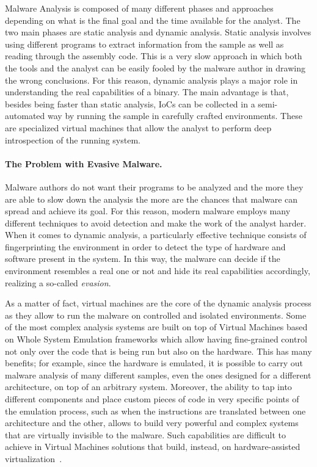 Malware Analysis is composed of many different phases and approaches depending on what is the final goal and the time available for the analyst. The two main phases are static analysis and dynamic analysis. Static analysis involves using different programs to extract information from the sample as well as reading through the assembly code. This is a very slow approach in which both the tools and the analyst can be easily fooled by the malware author in drawing the wrong conclusions. For this reason, dynamic analysis plays a major role in understanding the real capabilities of a binary. The main advantage is that, besides being faster than static analysis, IoCs can be collected in a semi-automated way by running the sample in carefully crafted environments. These are specialized virtual machines that allow the analyst to perform deep introspection of the running system.

\paragraph{The Problem with Evasive Malware.}
Malware authors do not want their programs to be analyzed and the more they are able to slow down the analysis the more are the chances that malware can spread and achieve its goal. For this reason, modern malware employs many different techniques to avoid detection and make the work of the analyst harder. When it comes to dynamic analysis, a particularly effective technique consists of fingerprinting the environment in order to detect the type of hardware and software present in the system. In this way, the malware can decide if the environment resembles a real one or not and hide its real capabilities accordingly, realizing a so-called \textit{evasion}.

As a matter of fact, virtual machines are the core of the dynamic analysis process as they allow to run the malware on controlled and isolated environments. Some of the most complex analysis systems are built on top of Virtual Machines based on Whole System Emulation frameworks which allow having fine-grained control not only over the code that is being run but also on the hardware. This has many benefits; for example, since the hardware is emulated, it is possible to carry out malware analysis of many different samples, even the ones designed for a different architecture, on top of an arbitrary system. Moreover, the ability to tap into different components and place custom pieces of code in very specific points of the emulation process, such as when the instructions are translated between one architecture and the other, allows to build very powerful and complex systems that are virtually invisible to the malware. Such capabilities are difficult to achieve in Virtual Machines solutions that build, instead, on hardware-assisted virtualization~\cite{Lastline2014FullSE}.


